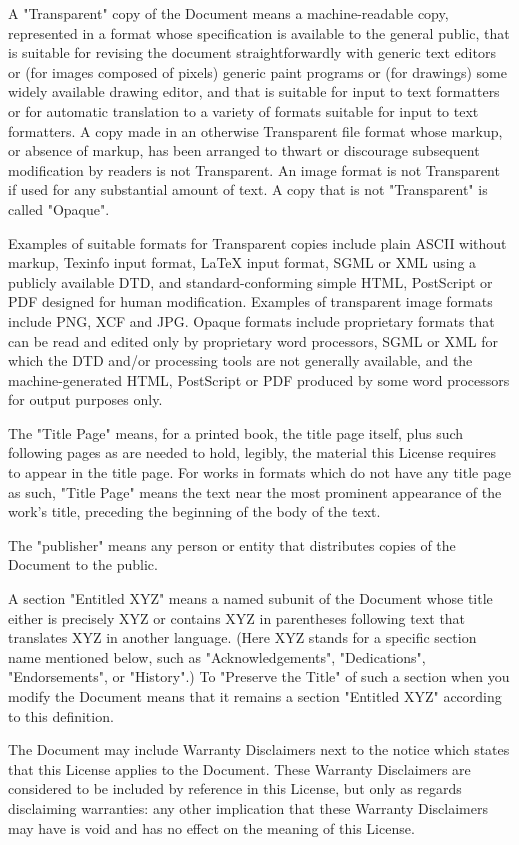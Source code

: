 A "Transparent" copy of the Document means a machine-readable copy,
represented in a format whose specification is available to the general
public, that is suitable for revising the document straightforwardly
with generic text editors or (for images composed of pixels) generic
paint programs or (for drawings) some widely available drawing editor,
and that is suitable for input to text formatters or for automatic
translation to a variety of formats suitable for input to text
formatters. A copy made in an otherwise Transparent file format whose
markup, or absence of markup, has been arranged to thwart or discourage
subsequent modification by readers is not Transparent. An image format
is not Transparent if used for any substantial amount of text. A copy
that is not "Transparent" is called "Opaque".

Examples of suitable formats for Transparent copies include plain ASCII
without markup, Texinfo input format, LaTeX input format, SGML or XML
using a publicly available DTD, and standard-conforming simple HTML,
PostScript or PDF designed for human modification. Examples of
transparent image formats include PNG, XCF and JPG. Opaque formats
include proprietary formats that can be read and edited only by
proprietary word processors, SGML or XML for which the DTD and/or
processing tools are not generally available, and the machine-generated
HTML, PostScript or PDF produced by some word processors for output
purposes only.

The "Title Page" means, for a printed book, the title page itself, plus
such following pages as are needed to hold, legibly, the material this
License requires to appear in the title page. For works in formats which
do not have any title page as such, "Title Page" means the text near the
most prominent appearance of the work's title, preceding the beginning
of the body of the text.

The "publisher" means any person or entity that distributes copies of
the Document to the public.

A section "Entitled XYZ" means a named subunit of the Document whose
title either is precisely XYZ or contains XYZ in parentheses following
text that translates XYZ in another language. (Here XYZ stands for a
specific section name mentioned below, such as "Acknowledgements",
"Dedications", "Endorsements", or "History".) To "Preserve the Title" of
such a section when you modify the Document means that it remains a
section "Entitled XYZ" according to this definition.

The Document may include Warranty Disclaimers next to the notice which
states that this License applies to the Document. These Warranty
Disclaimers are considered to be included by reference in this License,
but only as regards disclaiming warranties: any other implication that
these Warranty Disclaimers may have is void and has no effect on the
meaning of this License.

